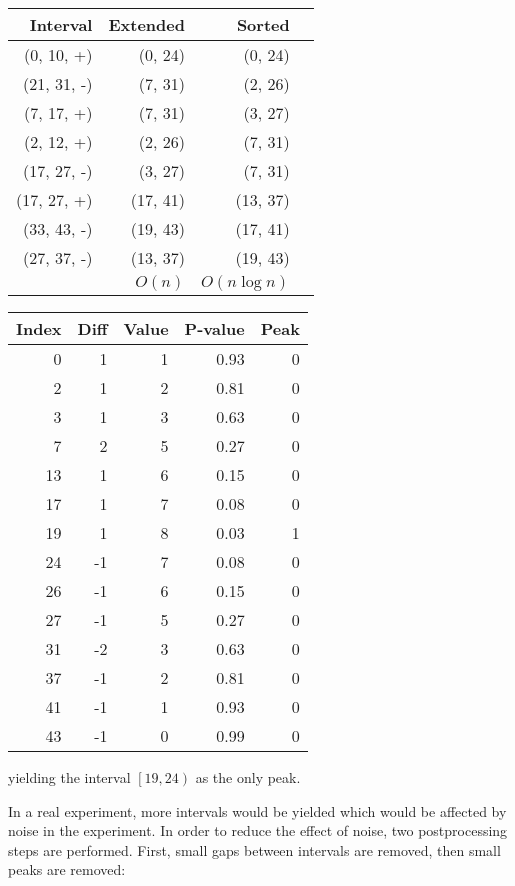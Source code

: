 \documentclass[border=10pt]{article}
\begin{document}
\begin{tabular}{| r | r | r | r |}
  \hline
  Interval & Extended & Sorted\\
  \hline
  (0, 10, +)  & (0, 24)  & (0, 24) \\
  (21, 31, -) & (7, 31)  & (2, 26) \\
  (7, 17, +)  & (7, 31)  & (3, 27) \\
  (2, 12, +)  & (2, 26)  & (7, 31) \\
  (17, 27, -) & (3, 27)  & (7, 31) \\
  (17, 27, +) & (17, 41) & (13, 37)\\
  (33, 43, -) & (19, 43) & (17, 41)\\
  (27, 37, -) & (13, 37) & (19, 43)\\
  \hline
              & $O(n)$   & $O(n \log n)$\\
  \hline
\end{tabular}
\begin{tabular}{|r|r|r|r|r|}
  \hline
  Index & Diff & Value & P-value & Peak \\
  \hline
  0  & 1  & 1 & 0.93 & 0 \\
  2  & 1  & 2 & 0.81 & 0 \\
  3  & 1  & 3 & 0.63 & 0 \\
  7  & 2  & 5 & 0.27 & 0 \\
  13 & 1  & 6 & 0.15 & 0 \\
  17 & 1  & 7 & 0.08 & 0 \\
  19 & 1  & 8 & 0.03 & 1 \\
  24 & -1 & 7 & 0.08 & 0 \\
  26 & -1 & 6 & 0.15 & 0 \\
  27 & -1 & 5 & 0.27 & 0 \\
  31 & -2 & 3 & 0.63 & 0 \\
  37 & -1 & 2 & 0.81 & 0 \\
  41 & -1 & 1 & 0.93 & 0 \\
  43 & -1 & 0 & 0.99 & 0 \\
  \hline
\end{tabular}
yielding the interval $\left[19, 24\right)$ as the only peak.

In a real experiment, more intervals would be yielded which would be affected by noise in the experiment. 
In order to reduce the effect of noise, two postprocessing steps are performed. First, small gaps between intervals are removed, then small peaks are removed:
\end{document}
